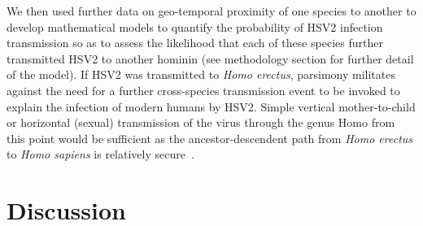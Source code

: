 \documentclass[fleqn,10pt]{wlscirep}
\begin{document}
We then used further data on geo-temporal proximity of one species to another to develop mathematical models to quantify the probability of HSV2 infection transmission so as to assess the likelihood that each of these species further transmitted HSV2 to another hominin (see methodology section for further detail of the model). If HSV2 was transmitted to \textit{Homo erectus}, parsimony militates against the need for a further cross-species transmission event to be invoked to explain the infection of modern humans by HSV2. Simple vertical mother-to-child or horizontal (sexual) transmission of the virus through the genus Homo from this point would be sufficient as the ancestor-descendent path from \textit{Homo erectus} to \textit{Homo sapiens} is relatively secure~\cite{Maslin2015}.

\section*{Discussion}
\end{document}
